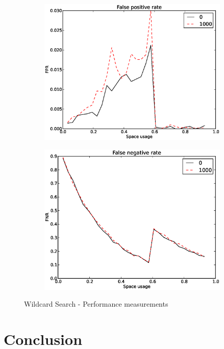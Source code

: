 \documentclass[a4paper,11pt]{article}
\begin{document}
\begin{figure}[H]
\centering
\begin{subfigure}{.5\textwidth}
  \label{fig:w-query-performance}
  \centering
  \includegraphics[width=.95\linewidth]{wildcard_1000_FPR1}
  \caption{}
\end{subfigure}%
\begin{subfigure}{.5\textwidth}
  \label{fig:w-short-circuit}
  \centering
  \includegraphics[width=.95\linewidth]{wildcard_1000_FNR1}
  \caption{}
\end{subfigure}
  \caption{Wildcard Search - Performance measurements}
  \label{fig:w-perf}
\end{figure}


\section{Conclusion}
\end{document}
